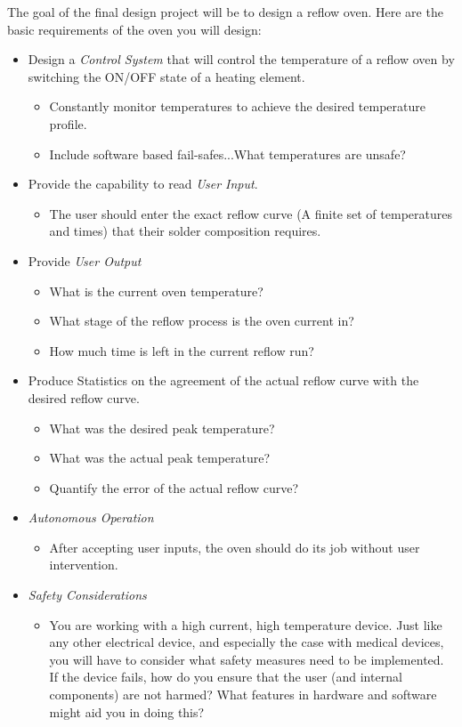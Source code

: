 \documentclass[10pt]{report}
\begin{document}
\par The goal of the final design project will be to design a reflow oven. Here are the basic requirements of the oven you will design:


\begin{itemize}
\item Design a \emph{Control System}  that will control the temperature of a reflow oven by switching the ON/OFF state of a heating element.
	\begin{itemize}
	\item Constantly monitor temperatures to achieve the desired temperature profile.
	\item Include software based fail-safes...What temperatures are unsafe?
	\end{itemize}
\item Provide the capability to read \emph{User Input}.
	\begin{itemize}
	\item The user should enter the exact reflow curve (A finite set of temperatures and times) that their solder composition requires.
	\end{itemize}
\item 	Provide \emph{User Output}
	\begin{itemize}
	\item What is the current oven temperature?
	\item What stage of the reflow process is the oven current in?
	\item How much time is left in the current reflow run?
	\end{itemize}
\item Produce Statistics on the agreement of the actual reflow curve with the desired reflow curve.
	\begin{itemize}
	\item What was the desired peak temperature?
	\item What was the actual peak temperature?
	\item Quantify the error of the actual reflow curve?
	\end{itemize}
\item \emph{Autonomous Operation}
	\begin{itemize}
	\item After accepting user inputs, the oven should do its job without user intervention.
	\end{itemize}
\item \emph{Safety Considerations}
	\begin{itemize}
	\item You are working with a high current, high temperature device. Just like any other electrical device, and especially the case with medical devices, 		you will have to consider what safety measures need to be implemented. If the device fails, how do you ensure that the user (and internal 				components) are not harmed? What features in hardware and software might aid you in doing this? 


\end{itemize}
\end{itemize}
\end{document}

